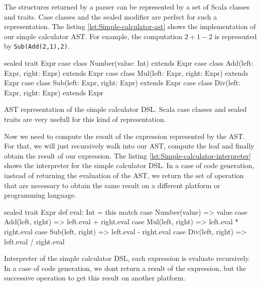 The structures returned by a parser can be represented by a set of Scala classes
and traits. Case classes and the sealed modifier are perfect for such a
representation. The listing \ref{lst:Simple-calculator-ast} shows the
implementation of our simple calculator \gls{AST}. For example, the computation
$2 + 1 - 2$ is represented by \verb|Sub(Add(2,1),2)|.

\begin{listing}[ht]
\centering
\begin{scalacode}
sealed trait Expr
case class Number(value: Int) extends Expr
case class Add(left: Expr, right: Expr) extends Expr
case class Mul(left: Expr, right: Expr) extends Expr
case class Sub(left: Expr, right: Expr) extends Expr
case class Div(left: Expr, right: Expr) extends Expr
\end{scalacode}
\caption[\gls{AST} representation of the simple calculator \gls{DSL}]{\gls{AST}
representation of the simple calculator \gls{DSL}. Scala case classes and sealed
traits are very usefull for this kind of representation.}
\label{lst:Simple-calculator-ast}
\end{listing}

Now we need to compute the result of the expression represented by the
\gls{AST}. For that, we will just recursively walk into our AST, compute the
leaf and finally obtain the result of our expression. The listing
\ref{lst:Simple-calculator-interpreter} shows the interpreter for the simple
calculator \gls{DSL}. In a case of code generation, instead of returning the
evaluation of the \gls{AST}, we return the set of operation that are necessary
to obtain the same result on a different platform or programming language.

\begin{listing}[ht]
\centering
\begin{scalacode}
sealed trait Expr {
  def eval: Int = this match {
    case Number(value) => value
    case Add(left, right) => left.eval + right.eval
    case Mul(left, right) => left.eval * right.eval
    case Sub(left, right) => left.eval - right.eval
    case Div(left, right) => left.eval / right.eval
  }
}
\end{scalacode}
\caption[Interpreter of the simple calculator \gls{DSL}]{Interpreter of the
simple calculator \gls{DSL}, each expression is evaluate recursively. In a case
of code generation, we dont return a result of the expression, but the
successive operation to get this result on another platform.}
\label{lst:Simple-calculator-interpreter}
\end{listing}

